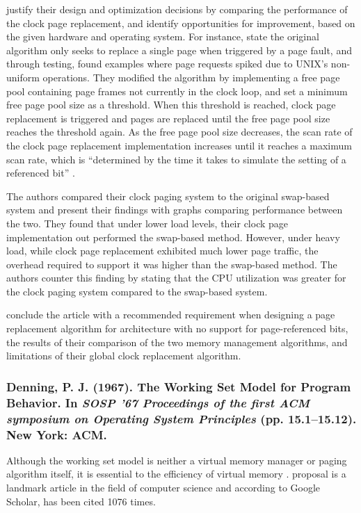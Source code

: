 \citet{Babaoglu1981} justify their design and optimization decisions by comparing the performance of the clock page replacement, and identify opportunities for improvement, based on the given hardware and operating system. For instance, \citet[p. 80]{Babaoglu1981} state the original algorithm only seeks to replace a single page when triggered by a page fault, and through testing, found examples where page requests spiked due to UNIX's non-uniform operations. They modified the algorithm by implementing a free page pool containing page frames not currently in the clock loop, and set a minimum free page pool size as a threshold. When this threshold is reached, clock page replacement is triggered and pages are replaced until the free page pool size reaches the threshold again. As the free page pool size decreases, the scan rate of the clock page replacement implementation increases until it reaches a maximum scan rate, which is ``determined by the time it takes to simulate the setting of a referenced bit'' \citep[p. 80]{Babaoglu1981}.

The authors compared their clock paging system to the original swap-based system and present their findings with graphs comparing performance between the two. They found that under lower load levels, their clock page implementation out performed the swap-based method. However, under heavy load, while clock page replacement exhibited much lower page traffic, the overhead required to support it was higher than the swap-based method. The authors counter this finding by stating that the CPU utilization was greater for the clock paging system compared to the swap-based system.

\citet{Babaoglu1981} conclude the article with a recommended requirement when designing a page replacement algorithm for architecture with no support for page-referenced bits, the results of their comparison of the two memory management algorithms, and limitations of their global clock replacement algorithm.

\subsubsection*{Denning, P. J. (1967). The Working Set Model for Program Behavior. In \emph{SOSP ’67 Proceedings of the first ACM symposium on Operating System Principles} (pp. 15.1–15.12). New York: ACM.}

Although the working set model is neither a virtual memory manager or paging algorithm itself, it is essential to the efficiency of virtual memory \citep{Silberschatz2013}.  proposal is a landmark article in the field of computer science and according to Google Scholar, has been cited 1076 times.

